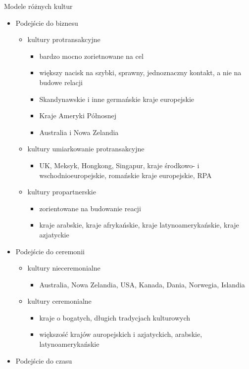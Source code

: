 \documentclass[a4paper,10pt]{report}
\begin{document}
\noindent Modele różnych kultur
\begin{itemize}
	\item Podejście do biznesu
	\begin{itemize}
		\item kultury protransakcyjne
		\begin{itemize}
			\item bardzo mocno zorietnowane na cel
			\item większy nacisk na szybki, sprawny, jednoznaczny kontakt, a nie na budowe relacji
			\item Skandynawskie i inne germańskie kraje europejskie
			\item Kraje Ameryki Półnosnej
			\item Australia i Nowa Zelandia
		\end{itemize}
		\item kultury umiarkowanie protransakcyjne
		\begin{itemize}
			\item UK, Meksyk, Hongkong, Singapur, kraje środkowo- i wschodnioeuropejskie, romańskie kraje europejskie, RPA
		\end{itemize}
		\item kultury propartnerskie
		\begin{itemize}
			\item zorientowane na budowanie reacji
			\item kraje arabskie, kraje afrykańskie, kraje latynoamerykańskie, kraje azjatyckie
		\end{itemize}
	\end{itemize}
	\item Podejście do ceremonii
	\begin{itemize}
		\item kultury nieceremonialne
		\begin{itemize}
			\item Australia, Nowa Zelandia, USA, Kanada, Dania, Norwegia, Islandia
		\end{itemize}
		\item kultury ceremonialne
		\begin{itemize}
			\item kraje o bogatych, długich tradycjach kulturowych
			\item większość krajów auropejskich i azjatyckich, arabskie, latynoamerykańskie
		\end{itemize}
	\end{itemize}
	\item Podejście do czasu

\end{itemize}
\end{document}
